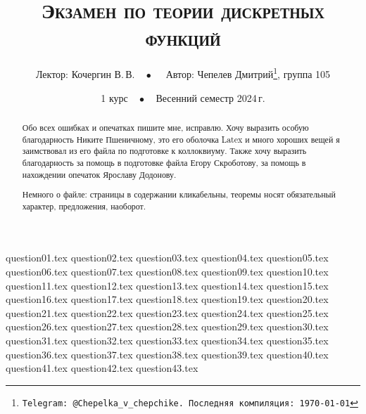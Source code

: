 \documentclass[a4paper, 11pt]{article}
\begin{document}
\title{\bfseries\scshape Экзамен по теории дискретных функций}
\date{1 курс$\quad\bullet\quad$Весенний семестр 2024\,г.}
\author{Лектор: Кочергин В.\,В.$\quad\bullet\quad$ Автор: Чепелев Дмитрий\thanks{\texttt{Telegram: @Chepelka\_v\_chepchike. Последняя компиляция: \today}}, группа 105}

\maketitle

\begin{abstract}
    Обо всех ошибках и опечатках пишите мне, исправлю. Хочу выразить особую благодарность Никите Пшеничному, это его оболочка Latex и много хороших вещей я заимствовал из его файла по подготовке к коллоквиуму. Также хочу выразить благодарность за помощь в подготовке файла Егору Скроботову, за помощь в нахождении опечаток Ярославу Додонову.

    Немного о файле: страницы в содержании кликабельны, теоремы носят обязательный характер, предложения, наоборот.
\end{abstract}

\tableofcontents

\newpage

{question01.tex}
{question02.tex}
{question03.tex}
{question04.tex}
{question05.tex}
{question06.tex}
{question07.tex}
{question08.tex}
{question09.tex}
{question10.tex}
{question11.tex}
{question12.tex}
{question13.tex}
{question14.tex}
{question15.tex}
{question16.tex}
{question17.tex}
{question18.tex}
{question19.tex}
{question20.tex}
{question21.tex}
{question22.tex}
{question23.tex}
{question24.tex}
{question25.tex}
{question26.tex}
{question27.tex}
{question28.tex}
{question29.tex}
{question30.tex}
{question31.tex}
{question32.tex}
{question33.tex}
{question34.tex}
{question35.tex}
{question36.tex}
{question37.tex}
{question38.tex}
{question39.tex}
{question40.tex}
{question41.tex}
{question42.tex}
{question43.tex}
\end{document}
